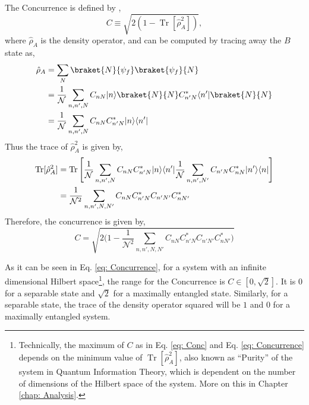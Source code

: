 \documentclass[12pt,a4paper]{report}
\theoremstyle{plain}
\theoremstyle{definition}
\theoremstyle{remark}
\DeclarePairedDelimiter\bra{\langle}{\rvert}
\DeclarePairedDelimiter\ket{\lvert}{\rangle}
\DeclareMathOperator{\Tr}{Tr}
\begin{document}
The Concurrence is defined by \cite{PhysRevLett.78.5022, PhysRevA.64.042315},
\begin{equation}
    C \equiv \sqrt{2(1 - \Tr[\hat{\rho}_A^2])},\label{eq: Conc}
\end{equation}
where $\hat{\rho}_A$ is the density operator, and can be computed by tracing away the $B$ state as,
\begin{equation}
    \begin{aligned}
        \hat{\rho}_A &= \sum_{N} \braket{N}{\psi_f} \braket{\psi_f}{N} \\
        &= \frac{1}{\mathcal{N}} \sum_{n,n',N} C_{nN} \ket{n} \braket{N}{N} C^{*}_{n'N} \bra{n'} \braket{N}{N}  \\
        &= \frac{1}{\mathcal{N}} \sum_{n,n',N} C_{nN}C^{*}_{n'N} \ket{n}\bra{n'}
    \end{aligned}
    \label{eq: DensityMatrix}
\end{equation}
Thus the trace of $\hat{\rho}_A^2$ is given by, 
\begin{equation}
    \begin{aligned}
        \Tr[\hat{\rho}_A^2] &= \Tr\Bigg[\frac{1}{\mathcal{N}} \sum_{n,n',N} C_{nN}C^{*}_{n'N} \ket{n}\bra{n'} \frac{1}{\mathcal{N}} \sum_{n,n',N'} C_{n'N}C^{*}_{nN} \ket{n'}\bra{n}\Bigg] \\
        &= \frac{1}{\mathcal{N}^2}\sum_{n,n',N,N'} C_{nN}C^{*}_{n'N} C_{n'N'}C^{*}_{nN'}
    \end{aligned}
\end{equation}
Therefore, the concurrence is given by,
\begin{equation}
    C = \sqrt{2\bigg(1 - \frac{1}{\mathcal{N}^2}\sum_{n,n',N,N'}C_{nN}C^{*}_{n'N} C_{n'N'}C^{*}_{nN'}\bigg)}
    \label{eq: Concurrence}
\end{equation}

 As it can be seen in Eq. \ref{eq: Concurrence}, for a system with an infinite dimensional Hilbert space\footnote{Technically, the maximum of $C$ as in Eq. \ref{eq: Conc} and Eq. \ref{eq: Concurrence} depends on the minimum value of $\Tr[\hat{\rho}_A^2]$, also known as ``Purity'' of the system in Quantum Information Theory, which is dependent on the number of dimensions of the Hilbert space of the system. More on this in Chapter \ref{chap: Analysis}.}, the range for the Concurrence is $C \in [0, \sqrt{2}]$. It is $0$ for a separable state and $\sqrt{2}$ for a maximally entangled state. Similarly, for a separable state, the trace of the density operator squared will be $1$ and $0$ for a maximally entangled system.
 
\end{document}
